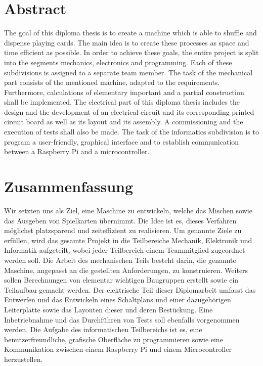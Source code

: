 \newpage
\thispagestyle{empty}
\mbox{}

\clearpage

\section*{Abstract}
\label{sec:abstract}
The goal of this diploma thesis is to create a machine which is able to shuffle and dispense playing cards.
The main idea is to create these processes as space and time efficient as possible.
In order to achieve these goals, the entire project is split into the segments mechanics, electronics and programming.
Each of these subdivisions is assigned to a separate team member.
The task of the mechanical part consists of the mentioned machine, adapted to the requirements.
Furthermore, calculations of elementary important and a partial construction shall be implemented.
The electrical part of this diploma thesis includes the design and the development of an electrical circuit and its corresponding printed circuit board as well as its layout and its assembly.
A commissioning and the execution of tests shall also be made.
The task of the informatics subdivision is to program a user-friendly, graphical interface and to establish communication between a Raspberry Pi and a microcontroller.
\section*{Zusammenfassung}
Wir setzten uns als Ziel, eine Maschine zu entwickeln, welche das Mischen sowie das Ausgeben von Spielkarten übernimmt.
Die Idee ist es, dieses Verfahren möglichst platzsparend und zeiteffizient zu realisieren.
Um genannte Ziele zu erfüllen, wird das gesamte Projekt in die Teilbereiche Mechanik, Elektronik und Informatik aufgeteilt, wobei jeder Teilbereich einem Teammitglied zugeordnet werden soll.
Die Arbeit des mechanischen Teils besteht darin, die genannte Maschine, angepasst an die gestellten Anforderungen, zu konstruieren.
Weiters sollen Berechnungen von elementar wichtigen Baugruppen erstellt sowie ein Teilaufbau gemacht werden.
Der elektrische Teil dieser Diplomarbeit umfasst das Entwerfen und das Entwickeln eines Schaltplans
und einer dazugehörigen Leiterplatte sowie das Layouten dieser und deren Bestückung.
Eine Inbetriebnahme und das Durchführen von Tests soll ebenfalls vorgenommen werden.
Die Aufgabe des informatischen Teilbereichs ist es, eine benutzerfreundliche, grafische Oberfläche zu programmieren sowie eine Kommunikation zwischen einem Raspberry Pi und einem Microcontroller herzustellen.
\clearpage

